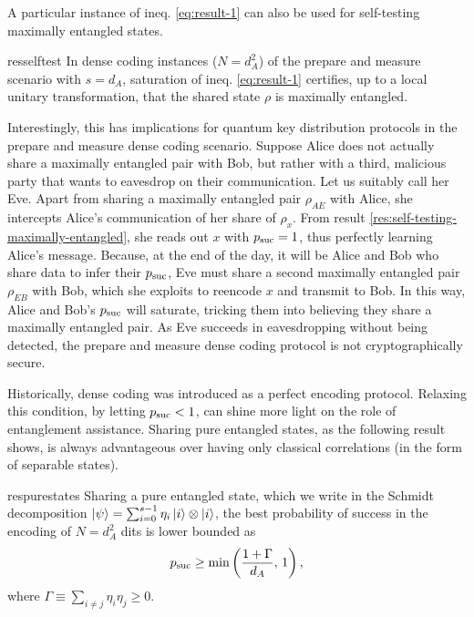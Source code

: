         A particular instance of ineq. \ref{eq:result-1} can also be used for self-testing maximally entangled states.
        \begin{restatable}{res}{selftest}
            In dense coding instances ($N=d_A^2$) of the prepare and measure scenario with $s=d_A$, saturation of ineq. \ref{eq:result-1} certifies, up to a local unitary transformation, that the shared state $\rho$ is maximally entangled.
            \label{res:self-testing-maximally-entangled}
        \end{restatable}
        
        Interestingly, this has implications for quantum key distribution protocols in the prepare and measure dense coding scenario. Suppose Alice does not actually share a maximally entangled pair with Bob, but rather with a third, malicious party that wants to eavesdrop on their communication. Let us suitably call her Eve. Apart from sharing a maximally entangled pair $\rho_{AE}$ with Alice, she intercepts Alice's communication of her share of $\rho_x$. From result \ref{res:self-testing-maximally-entangled}, she reads out $x$ with $p_{\text{suc}} = 1$, thus perfectly learning Alice's message. Because, at the end of the day, it will be Alice and Bob who share data to infer their $p_{\text{suc}}$, Eve must share a second maximally entangled pair $\rho_{EB}$ with Bob, which she exploits to reencode $x$ and transmit to Bob. In this way, Alice and Bob's $p_{\text{suc}}$ will saturate, tricking them into believing they share a maximally entangled pair. As Eve succeeds in eavesdropping without being detected, the prepare and measure dense coding protocol is not cryptographically secure.
        
        Historically, dense coding was introduced as a perfect encoding protocol. Relaxing this condition, by letting $p_{\text{suc}} < 1$, can shine more light on the role of entanglement assistance. Sharing pure entangled states, as the following result shows, is always advantageous over having only classical correlations (in the form of separable states).
        \begin{restatable}{res}{purestates}
            Sharing a pure entangled state, which we write in the Schmidt decomposition $\ket{\psi} = \sum_{i = 0}^{s-1} \eta_i \ket{i} \otimes \ket{i}$, the best probability of success in the encoding of $N = d_A^2$ dits is lower bounded as
            $$
                p_{\text{suc}} \geq \min \left( \frac{1 + \Gamma}{d_A}, \,1 \right),
            $$
            where $\Gamma \equiv \sum_{i \neq j} \eta_i \eta_j \geq 0$.
        \label{res:pure-states-advantage}
        \end{restatable}
        
